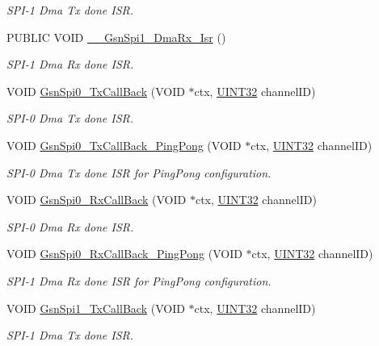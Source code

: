 \begin{DoxyCompactItemize}
\begin{DoxyCompactList}\small\item\em SPI-\/1 Dma Tx done ISR. \end{DoxyCompactList}\item 
PUBLIC VOID \hyperlink{a00655_ga3c3d0c3affa07b1b86fe208055666de6}{\_\-\_\-GsnSpi1\_\-DmaRx\_\-Isr} ()
\begin{DoxyCompactList}\small\item\em SPI-\/1 Dma Rx done ISR. \end{DoxyCompactList}\item 
VOID \hyperlink{a00655_ga0546bc1bf8f01326d3252b07af8551d1}{GsnSpi0\_\-TxCallBack} (VOID $\ast$ctx, \hyperlink{a00660_gae1e6edbbc26d6fbc71a90190d0266018}{UINT32} channelID)
\begin{DoxyCompactList}\small\item\em SPI-\/0 Dma Tx done ISR. \end{DoxyCompactList}\item 
VOID \hyperlink{a00655_ga4b5207e6c3b7b0ba513a8efe4e0c58f9}{GsnSpi0\_\-TxCallBack\_\-PingPong} (VOID $\ast$ctx, \hyperlink{a00660_gae1e6edbbc26d6fbc71a90190d0266018}{UINT32} channelID)
\begin{DoxyCompactList}\small\item\em SPI-\/0 Dma Tx done ISR for PingPong configuration. \end{DoxyCompactList}\item 
VOID \hyperlink{a00655_gab0a94dc945496de3fae944b7a20b1748}{GsnSpi0\_\-RxCallBack} (VOID $\ast$ctx, \hyperlink{a00660_gae1e6edbbc26d6fbc71a90190d0266018}{UINT32} channelID)
\begin{DoxyCompactList}\small\item\em SPI-\/0 Dma Rx done ISR. \end{DoxyCompactList}\item 
VOID \hyperlink{a00655_gab4482aa8532a1a9b1f886148f19d5ecf}{GsnSpi0\_\-RxCallBack\_\-PingPong} (VOID $\ast$ctx, \hyperlink{a00660_gae1e6edbbc26d6fbc71a90190d0266018}{UINT32} channelID)
\begin{DoxyCompactList}\small\item\em SPI-\/1 Dma Rx done ISR for PingPong configuration. \end{DoxyCompactList}\item 
VOID \hyperlink{a00655_gaa25e67e9580c5965c4d2861e3a515b76}{GsnSpi1\_\-TxCallBack} (VOID $\ast$ctx, \hyperlink{a00660_gae1e6edbbc26d6fbc71a90190d0266018}{UINT32} channelID)
\begin{DoxyCompactList}\small\item\em SPI-\/1 Dma Tx done ISR. \end{DoxyCompactList}\item 

\end{DoxyCompactItemize}
